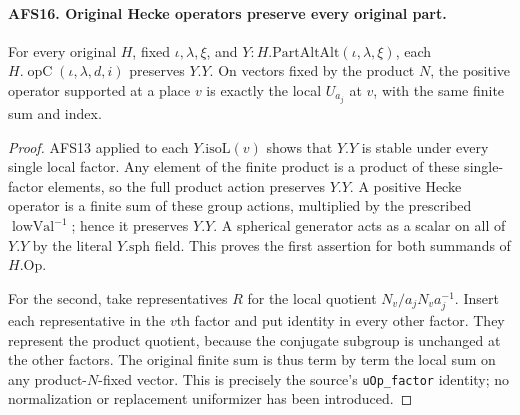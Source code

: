 \paragraph{AFS16. Original Hecke operators preserve every original part.}
\label{claim:AFS16}
For every original $H$, fixed $\iota,\lambda,\xi$, and
$Y:H.\mathrm{PartAltAlt}(\iota,\lambda,\xi)$, each
$H.\operatorname{opC}(\iota,\lambda,d,i)$ preserves $Y.Y$.
On vectors fixed by the product $N$, the positive operator
supported at a place $v$ is exactly the local $U_{a_j}$
at $v$, with the same finite sum and index.
\begin{proof}
AFS13 applied to each $Y.\mathrm{isoL}(v)$ shows that
$Y.Y$ is stable under every single local factor.  Any
element of the finite product is a product of these
single-factor elements, so the full product action
preserves $Y.Y$.  A positive Hecke operator is a finite
sum of these group actions, multiplied by the prescribed
$\operatorname{lowVal}^{-1}$; hence it preserves $Y.Y$.
A spherical generator acts as a scalar on all of $Y.Y$
by the literal $Y.\mathrm{sph}$ field.  This proves the
first assertion for both summands of $H.\mathrm{Op}$.

For the second, take representatives $R$ for the local
quotient $N_v/a_jN_va_j^{-1}$.  Insert each representative
in the $v$th factor and put identity in every other factor.
They represent the product quotient, because the conjugate
subgroup is unchanged at the other factors.  The original
finite sum is thus term by term the local sum on any
product-$N$-fixed vector.  This is precisely the source's
\texttt{uOp\_factor} identity; no normalization or
replacement uniformizer has been introduced.
\end{proof}


